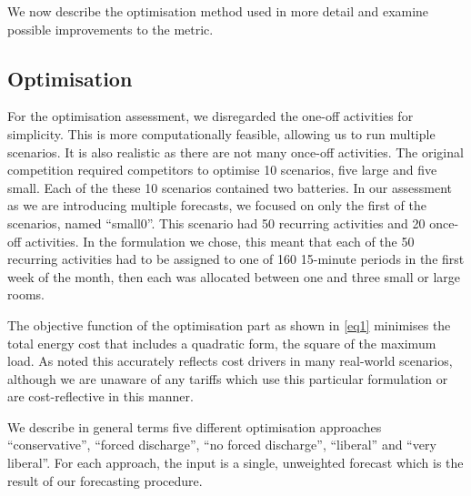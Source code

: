\documentclass[conference]{IEEEtran}
\begin{document}
We now describe the optimisation method used in more detail and examine possible improvements to the metric.


\subsection{Optimisation} 
For the optimisation assessment, we disregarded the one-off activities for simplicity. This is more computationally feasible, allowing us to run multiple scenarios. It is also realistic as there are not many once-off activities. The original competition required competitors to optimise 10 scenarios, five large and five small. Each of the these 10 scenarios contained two batteries. In our assessment as we are introducing multiple forecasts, we focused on only the first of the scenarios, named ``small0''. This scenario had 50 recurring activities and 20 once-off activities. In the formulation we chose, this meant that each of the 50 recurring activities had to be assigned to one of 160 15-minute periods in the first week of the month, then each was allocated between one and three small or large rooms. 


The objective function of the optimisation part as shown in \ref{eq1} minimises the total energy cost that includes a quadratic form, the square of the maximum load. As noted this accurately reflects cost drivers in many real-world scenarios, although we are unaware of any tariffs which use this particular formulation or are cost-reflective in this manner.



We describe in general terms five different optimisation approaches ``conservative'', ``forced discharge'', ``no forced discharge'', ``liberal'' and ``very liberal''. For each approach, the input is a single, unweighted forecast which is the result of our forecasting procedure. 
\end{document}
